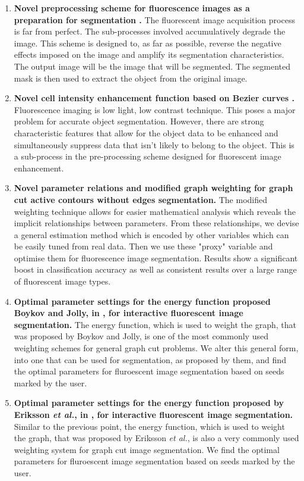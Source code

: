 \begin{enumerate}
	\item 
	\textbf{Novel preprocessing scheme for fluorescence images as a preparation for segmentation  \citep{Ryan2016}.}
	The fluorescent image acquisition process is far from perfect. The sub-processes involved accumulatively degrade the image. This scheme is designed to, as far as possible, reverse the negative effects imposed on the image and amplify its segmentation characteristics. The output image will be the image that will be segmented. The segmented mask is then used to extract the object from the original image.
	
	\item
	\textbf{Novel cell intensity enhancement function based on Bezier curves \citep{Ryan2016}.}
	Fluorescence imaging is low light, low contrast technique. This poses a major problem for accurate object segmentation. However, there are strong characteristic features that allow for the object data to be enhanced and simultaneously suppress data that isn't likely to belong to the object. This is a sub-process in the pre-processing scheme designed for fluorescent image enhancement.
	
	\item 
	\textbf{Novel parameter relations and modified graph weighting for graph cut active contours without edges segmentation.}
	The modified weighting technique allows for easier mathematical analysis which reveals the implicit relationships between parameters. From these relationships, we devise a general estimation method which is encoded by other variables which can be easily tuned from real data. Then we use these "proxy" variable and optimise them for fluorescence image segmentation. Results show a significant boost in classification accuracy as well as consistent results over a large range of fluorescent image types.
	
	\item
	\textbf{Optimal parameter settings for the energy function proposed Boykov and Jolly, in \citep{Boykov2001_2}, for interactive fluorescent image segmentation.}
	The energy function, which is used to weight the graph, that was proposed by Boykov and Jolly, is one of the most commonly used weighting schemes for general graph cut problems. We alter this general form, into one that can be used for segmentation, as proposed by them, and find the optimal parameters for fluroescent image segmentation based on seeds marked by the user.
	
	\item
	\textbf{Optimal parameter settings for the energy function proposed by Eriksson \textit{et al.}, in \citep{Eriksson2006}, for interactive fluorescent image segmentation.}
	Similar to the previous point, the energy function, which is used to weight the graph, that was proposed by  Eriksson \textit{et al.}, is also a very commonly used weighting system for graph cut image segmentation. We find the optimal parameters for fluroescent image segmentation based on seeds marked by the user.
	

\end{enumerate}
